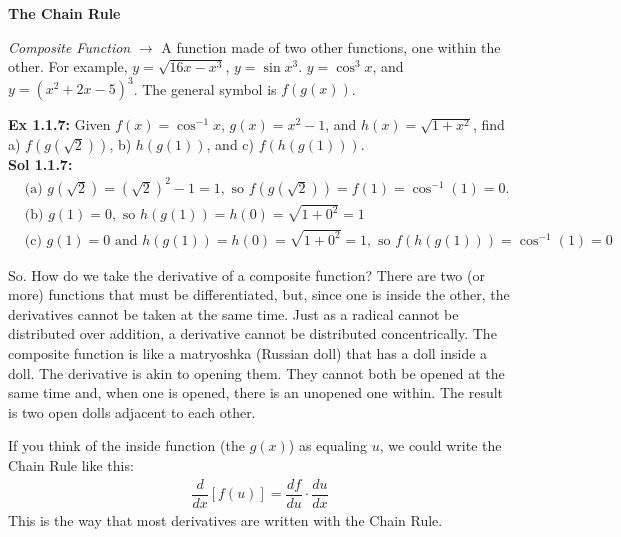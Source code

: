 \documentclass[11pt]{exam}
\newcommand{\diff}{\dfrac{d}{dx}}
\begin{document}
\newpage

\textbf{\large{The Chain Rule}} \par

\textit{Composite Function} $\rightarrow$ A function made of two other functions, one within the other. For example, $y = \sqrt{16x - x^3}$, $y = \sin{x^3}$. $y = \cos^3{x}$, and $y = \left(x^2 + 2x - 5\right)^3$. The general symbol is $f(g(x))$. \par

\textbf{Ex 1.1.7:} Given $f(x) = \cos^{-1} x$, $g(x) = x^2 - 1$, and $h(x) = \sqrt{1 + x^2}$, find a) $f\left(g\left(\sqrt{2}\right)\right)$, b) $h(g(1))$, and c) $f(h(g(1)))$. \\[11pt]
\textbf{Sol 1.1.7:} \begin{align*}
    &\text{(a) } g\left(\sqrt{2}\right) = \left(\sqrt{2}\right)^2 - 1 = 1, \text{ so } f\left(g\left(\sqrt{2}\right)\right) = f(1) = \cos^{-1}(1) = \boxed{0}. \\[11pt]
    &\text{(b) } g(1) = 0, \text{ so } h(g(1)) = h(0) = \sqrt{1 + 0^2} = \boxed{1} \\[11pt]
    &\text{(c) } g(1) = 0 \text{ and } h(g(1)) = h(0) = \sqrt{1 + 0^2} = 1, \text{ so } f(h(g(1))) = \cos^{-1}(1) = \boxed{0}
\end{align*}

So. How do we take the derivative of a composite function? There are two (or more) functions that must be differentiated, but, since one is inside the other, the derivatives cannot be taken at the same time. Just as a radical cannot be distributed over addition, a derivative cannot be distributed concentrically. The composite function is like a matryoshka (Russian doll) that has a doll inside a doll. The derivative is akin to opening them. They cannot both be opened at the same time and, when one is opened, there is an unopened one within. The result is two open dolls adjacent to each other. 

\fbox{\fbox{\begin{minipage}{0.96 \textwidth}
    \vspace{11pt}
    \begin{center}
        The Chain Rule: $\diff \left[f(g(x))\right] = f'(g(x)) \cdot g'(x)$
    \end{center}
    \vspace{11pt}
\end{minipage}}}

If you think of the inside function (the $g(x)$) as equaling $u$, we could write the Chain Rule like this: \begin{align*}
    \diff[f(u)] = \dfrac{df}{du} \cdot \dfrac{du}{dx}
\end{align*}
This is the way that most derivatives are written with the Chain Rule. \par
\end{document}
